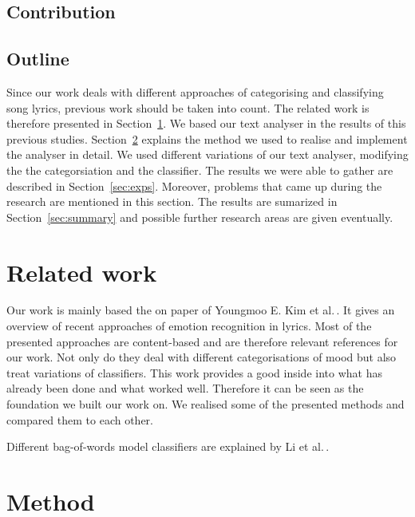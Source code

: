\documentclass[a4paper,12pt]{article}
\begin{document}
\subsection{Contribution}


\subsection{Outline}
Since our work deals with different approaches of categorising and classifying song lyrics, previous work should be taken into count. The related work is therefore presented in Section~\ref{sec:relwork}. We based our text analyser in the results of this previous studies. Section~\ref{sec:method} explains the method we used to realise and implement the analyser in detail. We used different variations of our text analyser, modifying the the categorsiation and the classifier. The results we were able to gather are described in  Section~\ref{sec:exps}. Moreover, problems that came up during the research are mentioned in this section. The results are sumarized in  Section~\ref{sec:summary} and possible further research areas are given eventually.

\section{Related work}
\label{sec:relwork}
Our work is mainly based the on paper of Youngmoo E. Kim et al.\,\cite{kim2010music}. It gives an overview of recent approaches of emotion recognition in lyrics.  Most of the presented approaches are content-based and are therefore relevant references for our work. Not only do they deal with different categorisations of mood but also treat variations of classifiers. This work provides a good inside into what has already been done and what worked well. Therefore it can be seen as the foundation we built our work on. We realised some of the presented methods and compared them to each other. 

Different bag-of-words model classifiers are explained by Li et al.\,\cite{li1998classification}.

\section{Method}
\label{sec:method}
\end{document}
